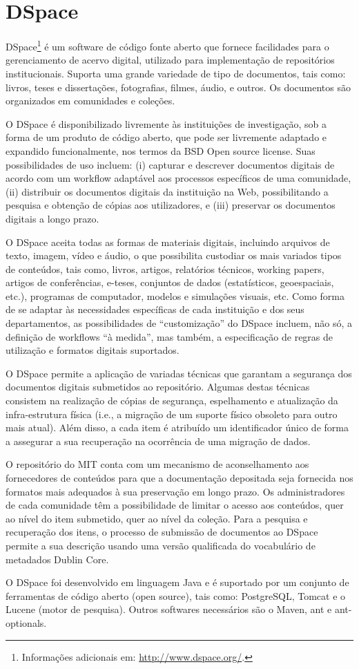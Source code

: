 \section*{DSpace}

DSpace\footnote{Informações adicionais em: \url{http://www.dspace.org/}.} é um software de código fonte aberto que fornece facilidades para o gerenciamento de acervo digital, utilizado para implementação de repositórios institucionais. Suporta uma grande variedade de tipo de documentos, tais como: livros, teses e dissertações, fotografias, filmes, áudio, e outros. Os documentos são organizados em comunidades e coleções.

O DSpace é disponibilizado livremente às instituições de investigação, sob a forma de um produto de código aberto, que pode ser livremente adaptado e expandido funcionalmente, nos termos da BSD Open source license. Suas possibilidades de uso incluem: (i) capturar e descrever documentos digitais de acordo com um workflow adaptável aos processos específicos de uma comunidade, (ii) distribuir os documentos digitais da instituição na Web, possibilitando a pesquisa e obtenção de cópias aos utilizadores, e (iii) preservar os documentos digitais a longo prazo.

O DSpace aceita todas as formas de materiais digitais, incluindo arquivos de texto, imagem, vídeo e áudio, o que possibilita custodiar os mais variados tipos de conteúdos, tais como, livros, artigos, relatórios técnicos, working papers, artigos de conferências, e-teses, conjuntos de dados (estatísticos, geoespaciais, etc.), programas de computador, modelos e simulações visuais, etc. Como forma de se adaptar às necessidades específicas de cada instituição e dos seus departamentos, as possibilidades de “customização” do DSpace incluem, não só, a definição de workflows “à medida”, mas também, a especificação de regras de utilização e formatos digitais suportados.

O DSpace permite a aplicação de variadas técnicas que garantam a segurança dos documentos digitais submetidos ao repositório. Algumas destas técnicas consistem na realização de cópias de segurança, espelhamento e atualização da infra-estrutura física (i.e., a migração de um suporte físico obsoleto para outro mais atual). Além disso, a cada item é atribuído um identificador único de forma a assegurar a sua recuperação na ocorrência de uma migração de dados.

O repositório do MIT conta com um mecanismo de aconselhamento aos fornecedores de conteúdos para que a documentação depositada seja fornecida nos formatos mais adequados à sua preservação em longo prazo. Os administradores de cada comunidade têm a possibilidade de limitar o acesso aos conteúdos, quer ao nível do item submetido, quer ao nível da coleção. Para a pesquisa e recuperação dos itens, o processo de submissão de documentos ao DSpace permite a sua descrição usando uma versão qualificada do vocabulário de metadados Dublin Core.

O DSpace foi desenvolvido em linguagem Java e é suportado por um conjunto de ferramentas de código aberto (open source), tais como: PostgreSQL, Tomcat e o Lucene (motor de pesquisa). Outros softwares necessários são o Maven, ant e ant-optionals.

